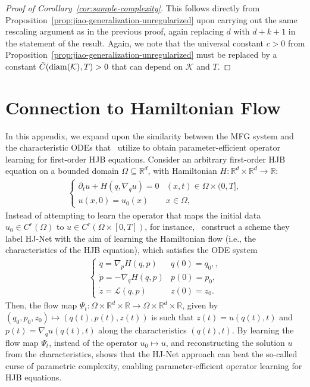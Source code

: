 \documentclass[11pt,reqno]{amsart}
\numberwithin{equation}{section}
\theoremstyle{plain}
\newcommand{\R}{\mathbb{R}}
\newcommand{\calK}{{\mathcal K}}
\newcommand{\calL}{{\mathcal L}}
\newcommand{\1}{\boldsymbol{\mathbbm{1}}}
\begin{document}
\begin{proof}[Proof of Corollary~\ref{cor:sample-complexity}]
This follows directly from Proposition~\ref{prop:jiao-generalization-unregularized} upon carrying out the same rescaling argument as in the previous proof, again replacing $d$ with $d + k + 1$ in the statement of the result. Again, we note that the universal constant $c > 0$ from Proposition~\ref{prop:jiao-generalization-unregularized} must be replaced by a constant $\Tilde{C}(\mathrm{diam}(\calK), T) > 0$ that can depend on $\calK$ and $T$.
\end{proof}

\section{Connection to Hamiltonian Flow}
\label{sec:hamiltonian-flow}
In this appendix, we expand upon the similarity between the MFG system and the characteristic ODEs that~\cite{Lanthaler2025} utilize to obtain parameter-efficient operator learning for first-order HJB equations. Consider an arbitrary first-order HJB equation on a bounded domain $\Omega \subseteq \R^d$, with Hamiltonian $H : \R^d \times \R^d \to \R$:
\begin{align}
\label{eqn:hj-equation}
    \begin{cases}
    \partial_t u + H(q, \nabla_q u) =0 & (x, t) \in \Omega \times (0, T], \\
    u(x, 0) = u_0(x) & x \in \Omega,
    \end{cases}
\end{align}
Instead of attempting to learn the operator that maps the initial data $u_0 \in C^r(\Omega)$ to $u \in C^r(\Omega \times [0, T])$, for instance,~\cite{Lanthaler2025} construct a scheme they label HJ-Net with the aim of learning the Hamiltonian flow (i.e., the characteristics of the HJB equation), which satisfies the ODE system
\begin{align}
\label{eqn:hj-flow}
    \begin{cases}
    \dot{q} = \nabla_p H(q, p) & q(0) = q_0,, \\
    \dot{p} = - \nabla_q H(q, p) & p(0) = p_0, \\
    \dot{z} = \calL(q, p) & z(0) = z_0.
    \end{cases}
\end{align}
Then, the flow map $\Psi_t : \Omega \times \R^d \times \R \to \Omega \times \R^d \times \R$, given by $(q_0, p_0, z_0) \mapsto (q(t), p(t), z(t))$ is such that $z(t) = u(q(t), t)$ and $p(t) = \nabla_q u(q(t), t)$ along the characteristics $(q(t), t)$. By learning the flow map $\Psi_t$, instead of the operator $u_0 \mapsto u$, and reconstructing the solution $u$ from the characteristics, \cite[Theorem 5.1]{Lanthaler2025} shows that the HJ-Net approach can beat the so-called curse of parametric complexity, enabling parameter-efficient operator learning for HJB equations. 
\end{document}
